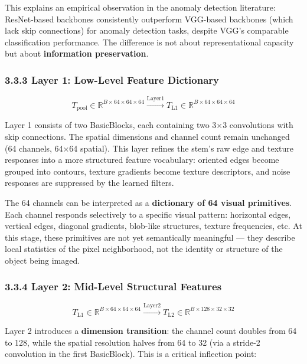 This explains an empirical observation in the anomaly detection literature: ResNet-based backbones consistently outperform VGG-based backbones (which lack skip connections) for anomaly detection tasks, despite VGG's comparable classification performance. The difference is not about representational capacity but about \textbf{information preservation}.

\subsubsection{3.3.3 Layer 1: Low-Level Feature Dictionary}\label{layer-1-low-level-feature-dictionary}

\[T_{\text{pool}} \in \mathbb{R}^{B \times 64 \times 64 \times 64} \xrightarrow{\text{Layer1}} T_{\text{L1}} \in \mathbb{R}^{B \times 64 \times 64 \times 64}\]

Layer 1 consists of two BasicBlocks, each containing two 3×3 convolutions with skip connections. The spatial dimensions and channel count remain unchanged (64 channels, 64×64 spatial). This layer refines the stem's raw edge and texture responses into a more structured feature vocabulary: oriented edges become grouped into contours, texture gradients become texture descriptors, and noise responses are suppressed by the learned filters.

The 64 channels can be interpreted as a \textbf{dictionary of 64 visual primitives}. Each channel responds selectively to a specific visual pattern: horizontal edges, vertical edges, diagonal gradients, blob-like structures, texture frequencies, etc. At this stage, these primitives are not yet semantically meaningful --- they describe local statistics of the pixel neighborhood, not the identity or structure of the object being imaged.

\subsubsection{3.3.4 Layer 2: Mid-Level Structural Features}\label{layer-2-mid-level-structural-features}

\[T_{\text{L1}} \in \mathbb{R}^{B \times 64 \times 64 \times 64} \xrightarrow{\text{Layer2}} T_{\text{L2}} \in \mathbb{R}^{B \times 128 \times 32 \times 32}\]

Layer 2 introduces a \textbf{dimension transition}: the channel count doubles from 64 to 128, while the spatial resolution halves from 64 to 32 (via a stride-2 convolution in the first BasicBlock). This is a critical inflection point:

